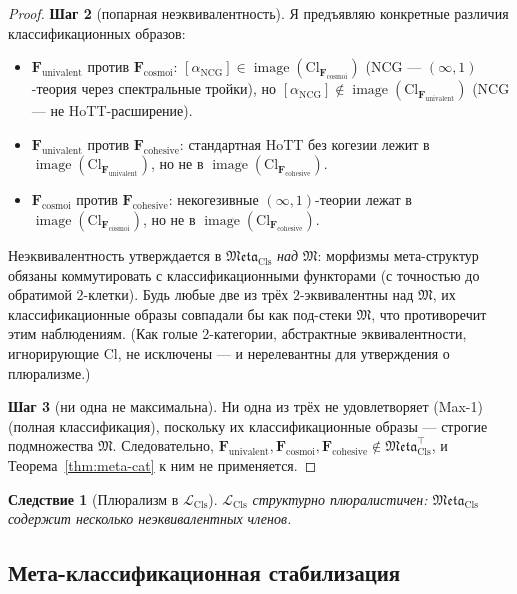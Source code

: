 \documentclass[11pt]{article}
\theoremstyle{plain}
\newtheorem{corollary}[theorem]{Следствие}
\theoremstyle{definition}
\newcommand{\fM}{\mathfrak{M}}
\newcommand{\Meta}{\mathfrak{Meta}}
\newcommand{\LCls}{\mathcal{L}_{\mathrm{Cls}}}
\newcommand{\Cl}{\mathrm{Cl}}
\DeclareMathOperator{\image}{image}
\begin{document}
\begin{proof}
\textbf{Шаг 2} (попарная неэквивалентность). Я предъявляю конкретные различия классификационных образов:
\begin{itemize}
\item $\mathbf{F}_{\mathrm{univalent}}$ против $\mathbf{F}_{\mathrm{cosmoi}}$: $[\alpha_{\mathrm{NCG}}] \in \image(\Cl_{\mathbf{F}_{\mathrm{cosmoi}}})$ (NCG — $(\infty, 1)$-теория через спектральные тройки), но $[\alpha_{\mathrm{NCG}}] \notin \image(\Cl_{\mathbf{F}_{\mathrm{univalent}}})$ (NCG — не HoTT-расширение).
\item $\mathbf{F}_{\mathrm{univalent}}$ против $\mathbf{F}_{\mathrm{cohesive}}$: стандартная HoTT без когезии лежит в $\image(\Cl_{\mathbf{F}_{\mathrm{univalent}}})$, но не в $\image(\Cl_{\mathbf{F}_{\mathrm{cohesive}}})$.
\item $\mathbf{F}_{\mathrm{cosmoi}}$ против $\mathbf{F}_{\mathrm{cohesive}}$: некогезивные $(\infty, 1)$-теории лежат в $\image(\Cl_{\mathbf{F}_{\mathrm{cosmoi}}})$, но не в $\image(\Cl_{\mathbf{F}_{\mathrm{cohesive}}})$.
\end{itemize}
Неэквивалентность утверждается в $\Meta_{\mathrm{Cls}}$ \emph{над} $\fM$: морфизмы мета-структур обязаны коммутировать с классификационными функторами (с точностью до обратимой $2$-клетки). Будь любые две из трёх $2$-эквивалентны над $\fM$, их классификационные образы совпадали бы как под-стеки $\fM$, что противоречит этим наблюдениям. (Как голые $2$-категории, абстрактные эквивалентности, игнорирующие $\Cl$, не исключены — и нерелевантны для утверждения о плюрализме.)

\textbf{Шаг 3} (ни одна не максимальна). Ни одна из трёх не удовлетворяет (Max-1) (полная классификация), поскольку их классификационные образы — строгие подмножества $\fM$. Следовательно, $\mathbf{F}_{\mathrm{univalent}}, \mathbf{F}_{\mathrm{cosmoi}}, \mathbf{F}_{\mathrm{cohesive}} \notin \Meta_{\mathrm{Cls}}^{\top}$, и Теорема~\ref{thm:meta-cat} к ним не применяется.
\end{proof}

\begin{corollary}[Плюрализм в $\LCls$]\label{cor:plurality}
$\LCls$ структурно плюралистичен: $\Meta_{\mathrm{Cls}}$ содержит несколько неэквивалентных членов.
\end{corollary}

\subsection{Мета-классификационная стабилизация}
\end{document}
